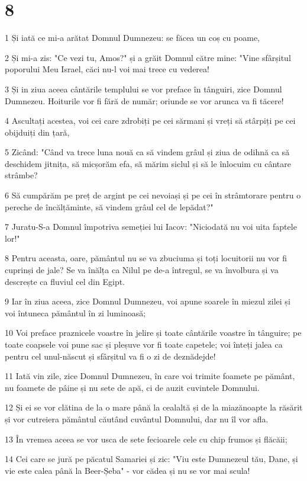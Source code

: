 \chapter{8}

\par 1 Și iată ce mi-a arătat Domnul Dumnezeu: se făcea un coș cu poame,
\par 2 Și mi-a zis: "Ce vezi tu, Amos?" și a grăit Domnul către mine: "Vine sfârșitul poporului Meu Israel, căci nu-l voi mai trece cu vederea!
\par 3 Și in ziua aceea cântările templului se vor preface în tânguiri, zice Domnul Dumnezeu. Hoiturile vor fi fără de număr; oriunde se vor arunca va fi tăcere!
\par 4 Ascultați acestea, voi cei care zdrobiți pe cei sărmani și vreți să stârpiți pe cei obijduiți din țară,
\par 5 Zicând: "Când va trece luna nouă ca să vindem grâul și ziua de odihnă ca să deschidem jitnița, să micșorăm efa, să mărim siclul și să le înlocuim cu cântare strâmbe?
\par 6 Să cumpărăm pe preț de argint pe cei nevoiași și pe cei în strâmtorare pentru o pereche de încălțăminte, să vindem grâul cel de lepădat?"
\par 7 Juratu-S-a Domnul împotriva semeției lui Iacov: "Niciodată nu voi uita faptele lor!"
\par 8 Pentru aceasta, oare, pământul nu se va zbuciuma și toți locuitorii nu vor fi cuprinși de jale? Se va înălța ca Nilul pe de-a întregul, se va învolbura și va descrește ca fluviul cel din Egipt.
\par 9 Iar în ziua aceea, zice Domnul Dumnezeu, voi apune soarele în miezul zilei și voi întuneca pământul în zi luminoasă;
\par 10 Voi preface praznicele voastre în jelire și toate cântările voastre în tânguire; pe toate coapsele voi pune sac și pleșuve vor fi toate capetele; voi înteți jalea ca pentru cel unul-născut și sfârșitul va fi o zi de deznădejde!
\par 11 Iată vin zile, zice Domnul Dumnezeu, în care voi trimite foamete pe pământ, nu foamete de pâine și nu sete de apă, ci de auzit cuvintele Domnului.
\par 12 Și ei se vor clătina de la o mare până la cealaltă și de la miazănoapte la răsărit și vor cutreiera pământul căutând cuvântul Domnului, dar nu îl vor afla.
\par 13 În vremea aceea se vor usca de sete fecioarele cele cu chip frumos și flăcăii;
\par 14 Cei care se jură pe păcatul Samariei și zic: "Viu este Dumnezeul tău, Dane, și vie este calea până la Beer-Șeba" - vor cădea și nu se vor mai scula!

